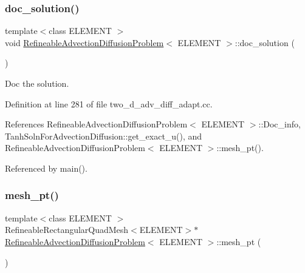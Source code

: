 \mbox{\label{classRefineableAdvectionDiffusionProblem_a735d7fdd587d4730ffe1113b11ca3b56}} 
\subsubsection{\texorpdfstring{doc\+\_\+solution()}{doc\_solution()}\hspace{0.1cm}{\footnotesize\ttfamily [2/2]}}
{\footnotesize\ttfamily template$<$class E\+L\+E\+M\+E\+NT $>$ \\
void \hyperlink{classRefineableAdvectionDiffusionProblem}{Refineable\+Advection\+Diffusion\+Problem}$<$ E\+L\+E\+M\+E\+NT $>$\+::doc\+\_\+solution (\begin{DoxyParamCaption}{ }\end{DoxyParamCaption})}



Doc the solution. 



Definition at line 281 of file two\+\_\+d\+\_\+adv\+\_\+diff\+\_\+adapt.\+cc.



References Refineable\+Advection\+Diffusion\+Problem$<$ E\+L\+E\+M\+E\+N\+T $>$\+::\+Doc\+\_\+info, Tanh\+Soln\+For\+Advection\+Diffusion\+::get\+\_\+exact\+\_\+u(), and Refineable\+Advection\+Diffusion\+Problem$<$ E\+L\+E\+M\+E\+N\+T $>$\+::mesh\+\_\+pt().



Referenced by main().

\mbox{\label{classRefineableAdvectionDiffusionProblem_abe616b5b3d3e4d3c0d3be777e3b3ac34}} 
\subsubsection{\texorpdfstring{mesh\+\_\+pt()}{mesh\_pt()}\hspace{0.1cm}{\footnotesize\ttfamily [1/2]}}
{\footnotesize\ttfamily template$<$class E\+L\+E\+M\+E\+NT $>$ \\
Refineable\+Rectangular\+Quad\+Mesh$<$E\+L\+E\+M\+E\+NT$>$$\ast$ \hyperlink{classRefineableAdvectionDiffusionProblem}{Refineable\+Advection\+Diffusion\+Problem}$<$ E\+L\+E\+M\+E\+NT $>$\+::mesh\+\_\+pt (\begin{DoxyParamCaption}{ }\end{DoxyParamCaption})\hspace{0.3cm}{\ttfamily [inline]}}



